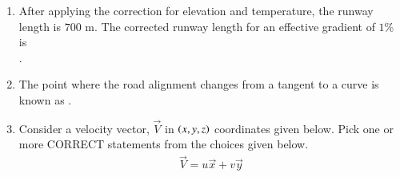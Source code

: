 \documentclass[journal,12pt,onecolumn]{article}
\theoremstyle{remark}
\begin{document}
\begin{enumerate}
    \hfill{}
    \begin{enumerate}
    \end{enumerate}

    \item After applying the correction for elevation and temperature, the runway length is $700$ m. The corrected runway length  for an effective gradient of $1$\% is \underline{\hspace{2cm}} \\ .

    \hfill{}
    \begin{enumerate}
    \end{enumerate}

    \item The point where the road alignment changes from a tangent to a curve is known as \underline{\hspace{2cm}}.

    \hfill{}
    \begin{enumerate}
    \end{enumerate}

    \item Consider a velocity vector, $\vec{V}$ in $\left(x, y, z\right)$ coordinates given below. Pick one or more CORRECT statements from the choices given below.
    \begin{align} \vec{V} = u\vec{x} + v\vec{y} \end{align}


\end{enumerate}
\end{document}
